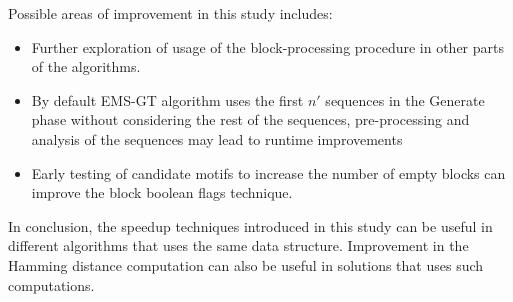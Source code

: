 Possible areas of improvement in this study includes:

\begin{itemize}

\item Further exploration of usage of the block-processing procedure in other parts of the algorithms.

\item By default EMS-GT algorithm uses the first $n'$ sequences in the Generate phase without considering the rest of the sequences, pre-processing and analysis of the sequences may lead to runtime improvements

\item Early testing of candidate motifs to increase the number of empty blocks can improve the block boolean flags technique. 

\end{itemize}

In conclusion, the speedup techniques introduced in this study can be useful in different algorithms that uses the same data structure. Improvement in the Hamming distance computation can also be useful in solutions that uses such computations.

